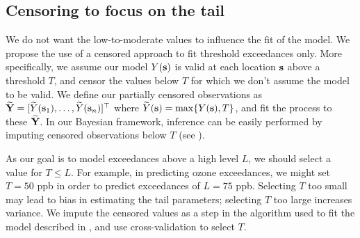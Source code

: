 \subsection{Censoring to focus on the tail} \label{sts:censoring}
We do not want the low-to-moderate values to influence the fit of the model.
We propose the use of a censored approach to fit threshold exceedances only.
More specifically, we assume our \skewt model $Y(\mathbf{s})$ is valid at each location $\mathbf{s}$ above a threshold $T$, and censor the values below $T$ for which we don't assume the model to be valid.
We define our partially censored observations as $\widetilde{\mathbf{Y}} = [\widetilde{Y}(\mathbf{s}_1), \ldots, \widetilde{Y}(\mathbf{s}_n)]^\top$ where $\widetilde{Y}(\mathbf{s}) = \max\{Y(\mathbf{s}), T\}$, and fit the \skewt process to these $\widetilde{\mathbf{Y}}$.
In our Bayesian framework, inference can be easily performed by imputing censored observations below $T$ (see ).

As our goal is to model exceedances above a high level $L$, we should select a value for $T \le L$.
For example, in predicting ozone exceedances, we might set $T = 50$ ppb in order to predict exceedances of $L = 75$ ppb.
Selecting $T$ too small may lead to bias in estimating the tail parameters; selecting $T$ too large increases variance.
We impute the censored values as a step in the algorithm used to fit the model described in , and use cross-validation to select $T$.

